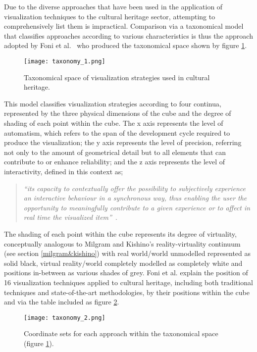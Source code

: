 Due to the diverse approaches that have been used in the application of visualization techniques to the cultural heritage sector, attempting to comprehensively list them is impractical. Comparison via a taxonomical model that classifies approaches according to various characteristics is thus the approach adopted by Foni et al.~\cite{Foni2010} who produced the taxonomical space shown by figure \ref{taxonomy_1.png}.

\begin{figure}[h]
\centering
  \texttt{[image: taxonomy\_1.png]}
  \caption{Taxonomical space of visualization strategies used in cultural heritage.}
  \label{taxonomy_1.png}
\end{figure}

This model classifies visualization strategies according to four continua, represented by the three physical dimensions of the cube and the degree of shading of each point within the cube. The x axis represents the level of automatism, which refers to the span of the development cycle required to produce the visualization; the y axis represents the level of precision, referring not only to the amount of geometrical detail but to all elements that can contribute to or enhance reliability; and the z axis represents the level of interactivity, defined in this context as;

\begin{quote}
	\textit{``its capacity to contextually offer the possibility to subjectively experience an interactive behaviour in a synchronous way, thus enabling the user the opportunity to meaningfully contribute to a given experience or to affect in real time the visualized  item''}~\cite{Foni2010}.
\end{quote}

The shading of each point within the cube represents its degree of virtuality, conceptually analogous to Milgram and Kishino's reality-virtuality continuum (see section \ref{milgram&kishino}) with real world/world unmodelled represented as solid black, virtual reality/world completely modelled as completely white and positions in-between as various shades of grey. Foni et al. explain the position of 16 visualization techniques applied to cultural heritage, including both traditional techniques and state-of-the-art methodologies, by their positions within the cube and via the table included as figure \ref{taxonomy_2.png}.

\begin{figure}[h]
\centering
  \texttt{[image: taxonomy\_2.png]}
  \caption{Coordinate sets for each approach within the taxonomical space (figure \ref{taxonomy_1.png}).}
  \label{taxonomy_2.png}
\end{figure}


